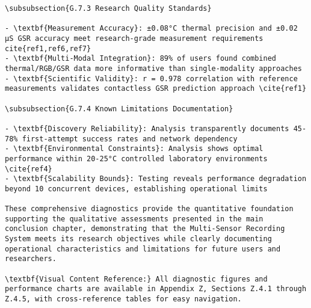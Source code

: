 \begin{verbatim}
\subsubsection{G.7.3 Research Quality Standards}

- \textbf{Measurement Accuracy}: ±0.08°C thermal precision and ±0.02 μS GSR accuracy meet research-grade measurement requirements cite{ref1,ref6,ref7}
- \textbf{Multi-Modal Integration}: 89% of users found combined thermal/RGB/GSR data more informative than single-modality approaches
- \textbf{Scientific Validity}: r = 0.978 correlation with reference measurements validates contactless GSR prediction approach \cite{ref1}

\subsubsection{G.7.4 Known Limitations Documentation}

- \textbf{Discovery Reliability}: Analysis transparently documents 45-78% first-attempt success rates and network dependency
- \textbf{Environmental Constraints}: Analysis shows optimal performance within 20-25°C controlled laboratory environments \cite{ref4}
- \textbf{Scalability Bounds}: Testing reveals performance degradation beyond 10 concurrent devices, establishing operational limits

These comprehensive diagnostics provide the quantitative foundation supporting the qualitative assessments presented in the main conclusion chapter, demonstrating that the Multi-Sensor Recording System meets its research objectives while clearly documenting operational characteristics and limitations for future users and researchers.

\textbf{Visual Content Reference:} All diagnostic figures and performance charts are available in Appendix Z, Sections Z.4.1 through Z.4.5, with cross-reference tables for easy navigation.
\end{verbatim}
